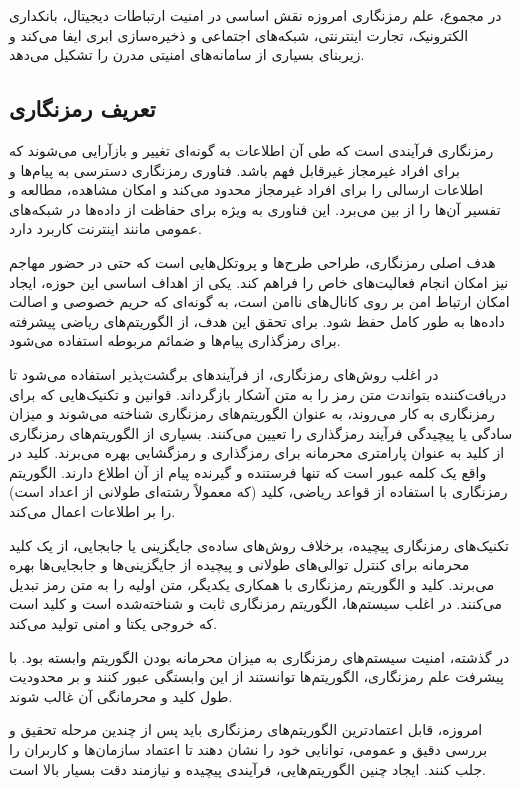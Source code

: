در مجموع، علم رمزنگاری امروزه نقش اساسی در امنیت ارتباطات دیجیتال، بانکداری الکترونیک، تجارت اینترنتی، شبکه‌های اجتماعی و ذخیره‌سازی ابری ایفا می‌کند و زیربنای بسیاری از سامانه‌های امنیتی مدرن را تشکیل می‌دهد.

\subsection{تعریف رمزنگاری}
رمزنگاری فرآیندی است که طی آن اطلاعات به گونه‌ای تغییر و بازآرایی می‌شوند که برای افراد غیرمجاز غیرقابل فهم باشد. فناوری رمزنگاری دسترسی به پیام‌ها و اطلاعات ارسالی را برای افراد غیرمجاز محدود می‌کند و امکان مشاهده، مطالعه و تفسیر آن‌ها را از بین می‌برد. این فناوری به ویژه برای حفاظت از داده‌ها در شبکه‌های عمومی مانند اینترنت کاربرد دارد\cite{ref17}.

هدف اصلی رمزنگاری، طراحی طرح‌ها و پروتکل‌هایی است که حتی در حضور مهاجم نیز امکان انجام فعالیت‌های خاص را فراهم کند. یکی از اهداف اساسی این حوزه، ایجاد امکان ارتباط امن بر روی کانال‌های ناامن است، به گونه‌ای که حریم خصوصی و اصالت داده‌ها به طور کامل حفظ شود. برای تحقق این هدف، از الگوریتم‌های ریاضی پیشرفته برای رمزگذاری پیام‌ها و ضمائم مربوطه استفاده می‌شود\cite{ref18}.

در اغلب روش‌های رمزنگاری، از فرآیندهای برگشت‌پذیر استفاده می‌شود تا دریافت‌کننده بتواندت متن رمز را به متن آشکار بازگرداند. قوانین و تکنیک‌هایی که برای رمزنگاری به کار می‌روند، به عنوان الگوریتم‌های رمزنگاری شناخته می‌شوند و میزان سادگی یا پیچیدگی فرآیند رمزگذاری را تعیین می‌کنند. بسیاری از الگوریتم‌های رمزنگاری از کلید به عنوان پارامتری محرمانه برای رمزگذاری و رمزگشایی بهره می‌برند. کلید در واقع یک کلمه عبور است که تنها فرستنده و گیرنده پیام از آن اطلاع دارند. الگوریتم رمزنگاری با استفاده از قواعد ریاضی، کلید (که معمولاً رشته‌ای طولانی از اعداد است) را بر اطلاعات اعمال می‌کند\cite{ref19}.

تکنیک‌های رمزنگاری پیچیده، برخلاف روش‌های ساده‌ی جایگزینی یا جابجایی، از یک کلید محرمانه برای کنترل توالی‌های طولانی و پیچیده از جایگزینی‌ها و جابجایی‌ها بهره می‌برند. کلید و الگوریتم رمزنگاری با همکاری یکدیگر، متن اولیه را به متن رمز تبدیل می‌کنند. در اغلب سیستم‌ها، الگوریتم رمزنگاری ثابت و شناخته‌شده است و کلید است که خروجی یکتا و امنی تولید می‌کند\cite{ref20}.

در گذشته، امنیت سیستم‌های رمزنگاری به میزان محرمانه بودن الگوریتم وابسته بود. با پیشرفت علم رمزنگاری، الگوریتم‌ها توانستند از این وابستگی عبور کنند و بر محدودیت طول کلید و محرمانگی آن غالب شوند.

امروزه، قابل اعتمادترین الگوریتم‌های رمزنگاری باید پس از چندین مرحله تحقیق و بررسی دقیق و عمومی، توانایی خود را نشان دهند تا اعتماد سازمان‌ها و کاربران را جلب کنند. ایجاد چنین الگوریتم‌هایی، فرآیندی پیچیده و نیازمند دقت بسیار بالا است\cite{ref21}.


